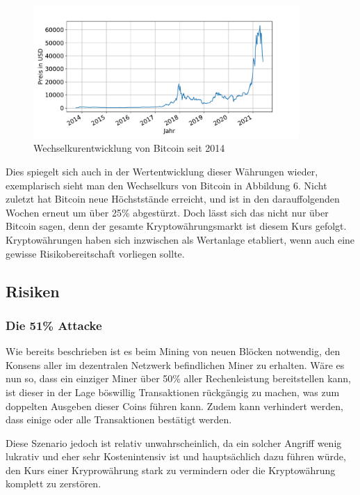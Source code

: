\documentclass[12pt,oneside]{article}
\begin{document}
\begin{figure}[h]
\centering
\includegraphics[width=0.9\textwidth]{./images/btcchart.pdf}
\caption{Wechselkurentwicklung von Bitcoin seit 2014 \cite{coindesk2021}}
\centering
\end{figure}

Dies spiegelt sich auch in der Wertentwicklung dieser Währungen wieder, exemplarisch sieht man den Wechselkurs von Bitcoin in Abbildung 6. Nicht zuletzt hat Bitcoin neue Höchststände erreicht, und ist in den darauffolgenden Wochen erneut um über 25\% abgestürzt. Doch lässt sich das nicht nur über Bitcoin sagen, denn der gesamte Kryptowährungsmarkt ist diesem Kurs gefolgt. Kryptowährungen haben sich inzwischen als Wertanlage etabliert, wenn auch eine gewisse Risikobereitschaft vorliegen sollte.\cite{coinmarketcap}
\subsection{Risiken}

\subsubsection{Die 51\% Attacke}

Wie bereits beschrieben ist es beim Mining von neuen Blöcken notwendig, den Konsens aller im dezentralen Netzwerk befindlichen Miner zu erhalten. Wäre es nun so, dass ein einziger Miner über 50\% aller Rechenleistung bereitstellen kann, ist dieser in der Lage böswillig Transaktionen rückgängig zu machen, was zum doppelten Ausgeben dieser Coins führen kann. Zudem kann verhindert werden, dass einige oder alle Transaktionen bestätigt werden. 

Diese Szenario jedoch ist relativ unwahrscheinlich, da ein solcher Angriff wenig lukrativ und eher sehr Kostenintensiv ist und hauptsächlich dazu führen würde, den Kurs einer Kryprowährung stark zu vermindern oder die Kryptowährung komplett zu zerstören. \citep{binance2021}
\end{document}
